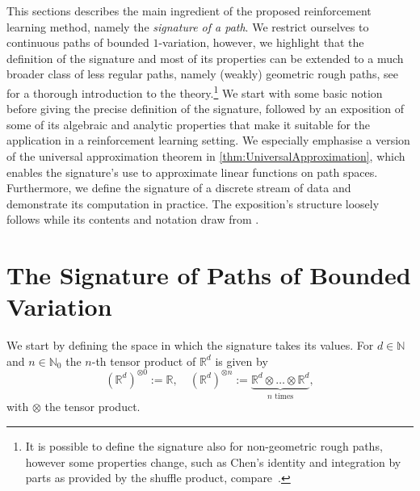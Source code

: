 \documentclass[
    a4paper,
    11pt,
    bibliography=totoc,
    listof=totoc,      
    headinclude=true,
    cleardoublepage=empty,
]{scrbook}
\theoremstyle{plain}
\theoremstyle{definition}
\theoremstyle{remark}
\newcommand{\SetR}{\mathbb R}
\newcommand{\SetN}{\mathbb N}
\begin{document}
This sections describes the main ingredient of the proposed reinforcement 
learning method, namely the \textit{signature of a path}. We restrict 
ourselves to continuous paths of bounded $1$-variation, however, we highlight
that the definition of the signature and most of its properties can be 
extended to a much broader class of less regular paths, namely (weakly) 
geometric rough paths, see \cite{lyons2007_dedrp} for a thorough introduction 
to the theory.\footnote{
    It is possible to define the signature also for non-geometric rough paths, however some properties change, such as Chen's identity and integration by parts as provided by the shuffle product, compare~\cite{hairer2015_gvnrp}.
}
We start with some basic notion before giving the precise definition of the
signature, followed by an exposition of some of its algebraic and analytic
properties that make it suitable for the application in a reinforcement
learning setting. We especially emphasise a version of the universal
approximation theorem in \cref{thm:UniversalApproximation}, which enables the
signature's use to approximate linear functions on path spaces. Furthermore,
we define the signature of a discrete stream of data and demonstrate its
computation in practice. The exposition's structure loosely follows 
\cite{bonnier2019_dst,lyons2023_smml} while its contents and notation draw from
\cite{cuchiero2023_smtc,bayer2021_osws}. 
%
\section{The Signature of Paths of Bounded Variation}
\label{chapter:Signature:section:BoundedVariation}

We start by defining the space in which the signature takes its values. 
For $d\in\SetN$ and $n\in\SetN_0$ the $n$-th tensor product of 
$\SetR^d$ is given by
\[
    (\SetR^d)^{\otimes 0} := \SetR, 
    \quad 
    (\SetR^d)^{\otimes n} := \underbrace{
        \SetR^d \otimes \dots \otimes \SetR^d
            }_{
        n \text{ times}
        },
\]
with $\otimes$ the tensor product.
\end{document}

